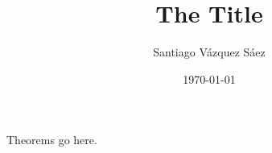 \documentclass[twoside]{article}
\begin{document}
\title{The Title}
\author{Santiago Vázquez Sáez}
\date{\today}
\maketitle




Theorems go here.
\end{document}
